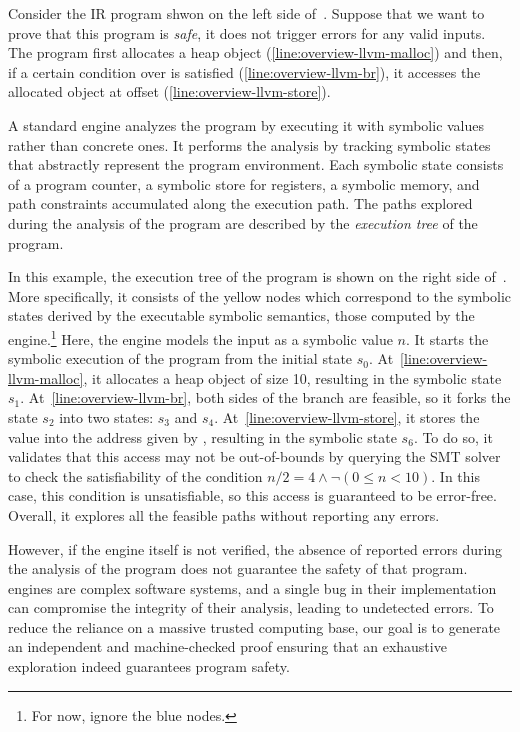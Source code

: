 Consider the \llvm IR program shwon on the left side of~.
Suppose that we want to prove that this program is \emph{safe},
\ie it does not trigger errors for any valid inputs.
The program first allocates a heap object (\cref{line:overview-llvm-malloc}) and then,
if a certain condition over  is satisfied (\cref{line:overview-llvm-br}), it accesses the allocated object at offset  (\cref{line:overview-llvm-store}).

A standard \SE engine analyzes the program by executing it with symbolic values rather than concrete ones.
It performs the analysis by tracking symbolic states that abstractly represent the program environment.
Each symbolic state consists of a program counter, a symbolic store for registers, a symbolic memory, and path constraints accumulated along the execution path.
The paths explored during the analysis of the program are described by the \emph{execution tree} of the program.

In this example,
the execution tree of the program is shown on the right side of~.
More specifically,
it consists of the yellow nodes which correspond to the symbolic states derived by the executable symbolic semantics, \ie those computed by the \SE engine.\footnote{
For now, ignore the blue nodes.
}
Here, the \SE engine models the input  as a symbolic value $n$.
It starts the symbolic execution of the program from the initial state $s_0$.
At~\cref{line:overview-llvm-malloc},
it allocates a heap object of size 10, resulting in the symbolic state $s_1$.
At~\cref{line:overview-llvm-br},
both sides of the branch are feasible,
so it forks the state $s_2$ into two states: $s_3$ and $s_4$.
At~\cref{line:overview-llvm-store},
it stores the value  into the address given by , resulting in the symbolic state $s_6$.
To do so,
it validates that this access may not be out-of-bounds by querying the SMT solver to check the satisfiability of the condition $n / 2 = 4 \land \neg (0 \leq n < 10)$.
In this case, this condition is unsatisfiable, so this access is guaranteed to be error-free.
Overall, it explores all the feasible paths without reporting any errors.

However, if the \SE engine itself is not verified,
the absence of reported errors during the analysis of the program does not guarantee the safety of that program.
\SE engines are complex software systems,
and a single bug in their implementation can compromise the integrity of their analysis, leading to undetected errors.
To reduce the reliance on a massive trusted computing base,
our goal is to generate an independent and machine-checked proof ensuring that an exhaustive exploration indeed guarantees program safety.


